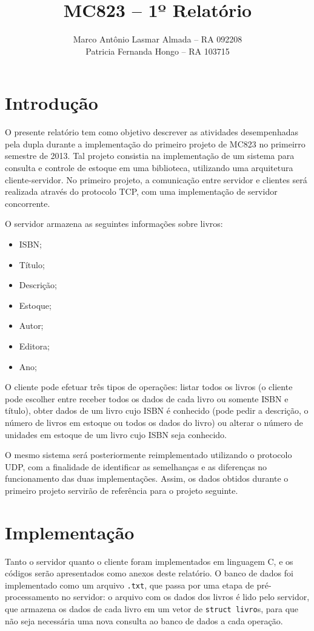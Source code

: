 \documentclass[11pt, brazil]{article} %
\title{MC823 -- 1º Relatório}
\author{Marco Antônio Lasmar Almada -- RA 092208 \\ Patricia Fernanda Hongo -- RA 103715}
\date{} %
\begin{document}
\maketitle

\section{Introdução}

O presente relatório tem como objetivo descrever as atividades desempenhadas pela dupla durante a implementação do primeiro projeto de MC823 no primeirro semestre de 2013. Tal projeto consistia na implementação de um sistema para consulta e controle de estoque em uma biblioteca, utilizando uma arquitetura cliente-servidor. No primeiro projeto, a comunicação entre servidor e clientes será realizada através do protocolo TCP, com uma implementação de servidor concorrente.

O servidor armazena as seguintes informações sobre livros:
\begin{itemize}
  \item ISBN;
  \item Título;
  \item Descrição;
  \item Estoque;
  \item Autor;
  \item Editora;
  \item Ano;  
\end{itemize}

O cliente pode efetuar três tipos de operações: listar todos os livros (o cliente pode escolher entre receber todos os dados de cada livro ou somente ISBN e título), obter dados de um livro cujo ISBN é conhecido (pode pedir a descrição, o número de livros em estoque ou todos os dados do livro) ou alterar o número de unidades em estoque de um livro cujo ISBN seja conhecido.

O mesmo sistema será posteriormente reimplementado utilizando o protocolo UDP, com a finalidade de identificar as semelhanças e as diferenças no funcionamento das duas implementações. Assim, os dados obtidos durante o primeiro projeto servirão de referência para o projeto seguinte.

\section{Implementação}

Tanto o servidor quanto o cliente foram implementados em linguagem C, e os códigos serão apresentados como anexos deste relatório.
O banco de dados foi implementado como um arquivo \texttt{.txt}, que passa por uma etapa de pré-processamento no servidor: o arquivo com os dados dos livros é lido pelo servidor, que armazena os dados de cada livro em um vetor de \texttt{struct livro}s, para que não seja necessária uma nova consulta ao banco de dados a cada operação. 
 
\end{document}
